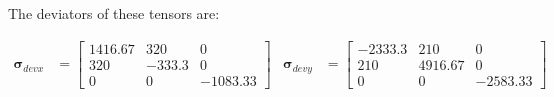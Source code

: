 The deviators of these tensors are: 

\begin{align*}
\mathbf{\sigma}_{devx} &= \left[ 
\begin{matrix}
1416.67 & 320 & 0\\
320 & -333.3 & 0\\
0 & 0 & -1083.33
\end{matrix}
\right]
&\mathbf{\sigma}_{devy} &= \left[
\begin{matrix}
-2333.3&210&0\\
210&4916.67&0\\
0&0&-2583.33
\end{matrix}
\right]
\end{align*}

